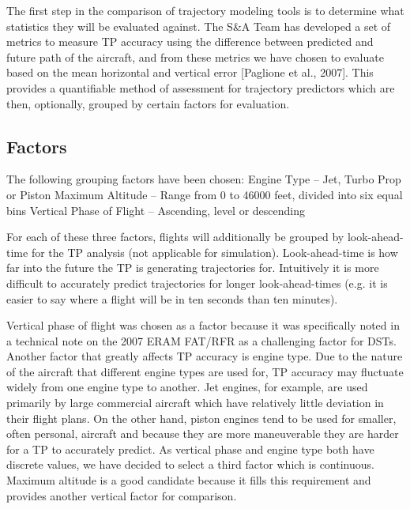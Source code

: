 \documentclass[]{article}
\begin{document}
The first step in the comparison of trajectory modeling tools is to determine what statistics they will be evaluated against. The S\&A Team has developed a set of metrics to measure TP accuracy using the difference between predicted and future path of the aircraft, and from these metrics we have chosen to evaluate based on the mean horizontal and vertical error [Paglione et al., 2007]. This provides a quantifiable method of assessment for trajectory predictors which are then, optionally, grouped by certain factors for evaluation.

\subsection{Factors}
\label{factors}
The following grouping factors have been chosen:
Engine Type – Jet, Turbo Prop or Piston
Maximum Altitude – Range from 0 to 46000 feet, divided into six equal bins
Vertical Phase of Flight – Ascending, level or descending

For each of these three factors, flights will additionally be grouped by look-ahead-time for the TP analysis (not applicable for simulation). Look-ahead-time is how far into the future the TP is generating trajectories for. Intuitively it is more difficult to accurately predict trajectories for longer look-ahead-times (e.g. it is easier to say where a flight will be in ten seconds than ten minutes).

Vertical phase of flight was chosen as a factor because it was specifically noted in a technical note on the 2007 ERAM FAT/RFR as a challenging factor for DSTs. Another factor that greatly affects TP accuracy is engine type. Due to the nature of the aircraft that different engine types are used for, TP accuracy may fluctuate widely from one engine type to another. Jet engines, for example, are used primarily by large commercial aircraft which have relatively little deviation in their flight plans. On the other hand, piston engines tend to be used for smaller, often personal, aircraft and because they are more maneuverable they are harder for a TP to accurately predict. As vertical phase and engine type both have discrete values, we have decided to select a third factor which is continuous. Maximum altitude is a good candidate because it fills this requirement and provides another vertical factor for comparison.

\end{document}
